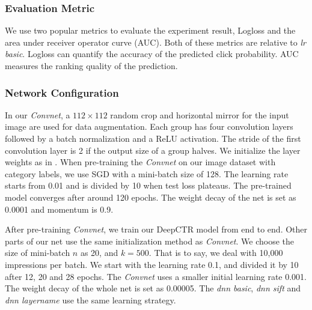 \documentclass{sig-alternate}
\begin{document}
\subsubsection{Evaluation Metric}
We use two popular metrics to evaluate the experiment result, Logloss and the area under receiver operator curve (AUC). Both of these metrics are relative to \emph{lr basic}. Logloss can quantify the accuracy of the predicted click probability. AUC measures the ranking quality of the prediction. 
\subsubsection{Network Configuration}
In our \emph{Convnet},  a $112 \times 112$ random crop  and horizontal mirror for the input image are used for data augmentation. Each group has four convolution layers followed by a batch normalization \cite{ioffe2015batch} and a ReLU \cite{nair2010rectified} activation. The stride of the first convolution layer is 2 if the output size of a group halves.  We initialize the layer weights as in  \cite{he2015delving}. When pre-training the \emph{Convnet} on our image dataset with category labels,  we use SGD with a mini-batch size of 128. The learning rate starts from 0.01 and is divided by 10 when test loss plateaus. The pre-trained model converges after around 120 epochs. The weight decay of the net is set as 0.0001 and momentum is 0.9. 

After pre-training  \emph{Convnet}, we train our DeepCTR model from end to end. Other parts of our net use the same  initialization method as  \emph{Convnet}. We choose the size of mini-batch $n$ as 20, and $k = 500$. That is to say, we deal with 10,000 impressions per batch.  We start with the learning rate 0.1, and divided it by 10 after 12, 20 and 28 epochs. The \emph{Convnet} uses a smaller initial learning rate 0.001. The weight decay of the whole net is set as 0.00005. The \emph{dnn basic}, \emph{dnn sift} and \emph{dnn layername} use the same learning strategy. 
\end{document}
